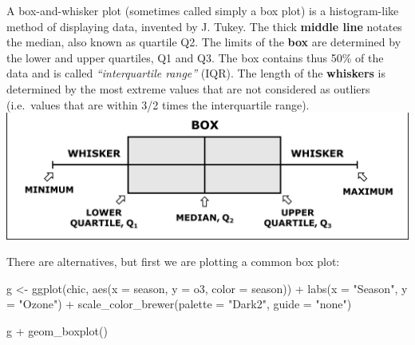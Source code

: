\documentclass[
  letterpaper,
]{scrbook}
\newenvironment{Shaded}{\begin{snugshade}}{\end{snugshade}}
\newcommand{\AttributeTok}[1]{\textcolor[rgb]{0.40,0.45,0.13}{#1}}
\newcommand{\FunctionTok}[1]{\textcolor[rgb]{0.28,0.35,0.67}{#1}}
\newcommand{\NormalTok}[1]{\textcolor[rgb]{0.00,0.23,0.31}{#1}}
\newcommand{\OtherTok}[1]{\textcolor[rgb]{0.00,0.23,0.31}{#1}}
\newcommand{\SpecialCharTok}[1]{\textcolor[rgb]{0.37,0.37,0.37}{#1}}
\newcommand{\StringTok}[1]{\textcolor[rgb]{0.13,0.47,0.30}{#1}}
\begin{document}
\begin{tcolorbox}[enhanced jigsaw, rightrule=.15mm, arc=.35mm, title=\textcolor{quarto-callout-tip-color}{\faLightbulb}\hspace{0.5em}{Recall: Box and Whiskers Plot}, colback=white, toptitle=1mm, colbacktitle=quarto-callout-tip-color!10!white, breakable, left=2mm, opacityback=0, leftrule=.75mm, bottomrule=.15mm, bottomtitle=1mm, colframe=quarto-callout-tip-color-frame, coltitle=black, toprule=.15mm, opacitybacktitle=0.6, titlerule=0mm]

A box-and-whisker plot (sometimes called simply a box plot) is a
histogram-like method of displaying data, invented by J. Tukey. The
thick \textbf{middle line} notates the median, also known as quartile
Q2. The limits of the \textbf{box} are determined by the lower and upper
quartiles, Q1 and Q3. The box contains thus 50\% of the data and is
called \emph{``interquartile range''} (IQR). The length of the
\textbf{whiskers} is determined by the most extreme values that are not
considered as outliers (i.e.~values that are within 3/2 times the
interquartile range). \includegraphics{extra_pics/boxplot.png}

\end{tcolorbox}

There are alternatives, but first we are plotting a common box plot:

\begin{Shaded}
\begin{Highlighting}[]
\NormalTok{g }\OtherTok{\textless{}{-}}
  \FunctionTok{ggplot}\NormalTok{(chic, }\FunctionTok{aes}\NormalTok{(}\AttributeTok{x =}\NormalTok{ season, }\AttributeTok{y =}\NormalTok{ o3,}
                   \AttributeTok{color =}\NormalTok{ season)) }\SpecialCharTok{+}
    \FunctionTok{labs}\NormalTok{(}\AttributeTok{x =} \StringTok{"Season"}\NormalTok{, }\AttributeTok{y =} \StringTok{"Ozone"}\NormalTok{) }\SpecialCharTok{+}
    \FunctionTok{scale\_color\_brewer}\NormalTok{(}\AttributeTok{palette =} \StringTok{"Dark2"}\NormalTok{, }\AttributeTok{guide =} \StringTok{"none"}\NormalTok{)}

\NormalTok{g }\SpecialCharTok{+} \FunctionTok{geom\_boxplot}\NormalTok{()}
\end{Highlighting}
\end{Shaded}
\end{document}
